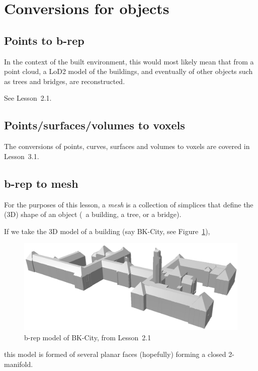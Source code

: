 %
\section{Conversions for objects}


\subsection{Points to b-rep}

In the context of the built environment, this would most likely mean that from a point cloud, a LoD2 model of the buildings, and eventually of other objects such as trees and bridges, are reconstructed.

See Lesson~2.1.

\subsection{Points/surfaces/volumes to voxels}

The conversions of points, curves, surfaces and volumes to voxels are covered in Lesson~3.1.


\subsection{b-rep to mesh}

For the purposes of this lesson, a \emph{mesh} is a collection of simplices that define the (3D) shape of an object (\eg\ a building, a tree, or a bridge).

If we take the 3D model of a building (say BK-City, see Figure~\ref{fig:bk-mesh}), 
\begin{figure}
  \centering
  \includegraphics[width=0.5\linewidth]{figs/bk-mesh}
  \caption{b-rep model of BK-City, from Lesson~2.1}%
\label{fig:bk-mesh}
\end{figure}
this model is formed of several planar faces (hopefully) forming a closed 2-manifold.

